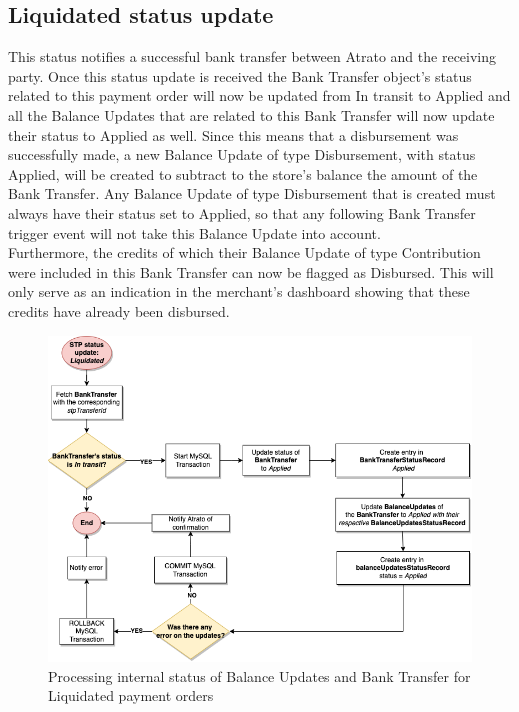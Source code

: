 \subsection{Liquidated status update}

This status notifies a successful bank transfer between Atrato and the receiving party. Once this status update is received the Bank Transfer object’s status related to this payment order will now be updated from In transit to Applied and all the Balance Updates that are related to this Bank Transfer will now update their status to Applied as well. Since this means that a disbursement was successfully made, a new Balance Update of type Disbursement, with status Applied, will be created to subtract to the store’s balance the amount of the Bank Transfer. Any Balance Update of type Disbursement that is created must always have their status set to Applied, so that any following Bank Transfer trigger event will not take this Balance Update into account.\\

Furthermore, the credits of which their Balance Update of type Contribution were included in this Bank Transfer can now be flagged as Disbursed. This will only serve as an indication in the merchant’s dashboard showing that these credits have already been disbursed.

\begin{figure} [h]
    \centering
    \includegraphics[scale = 0.4]{assets/diagrams/LiquidatedStatusUpdate.png}
    \caption{Processing internal status of Balance Updates and Bank Transfer for Liquidated payment orders}\label{fig:liquidated_status_update}
\end{figure}


